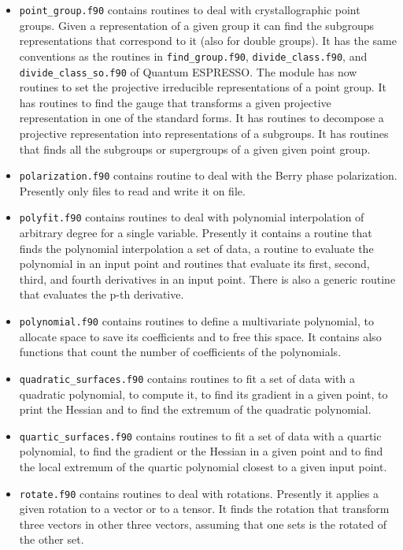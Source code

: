 \documentclass[12pt,a4paper,twoside]{report}
\def\qe{{\sc Quantum ESPRESSO}}
\begin{document}
\begin{itemize}
\item
\texttt{point\_group.f90} contains routines to deal with crystallographic
point groups. Given a representation of a given group it can find 
the subgroups representations that correspond to it (also for
double groups). It has the same conventions as the routines 
in \texttt{find\_group.f90}, \texttt{divide\_class.f90}, and 
\texttt{divide\_class\_so.f90} of \qe. The module has now routines to
set the projective irreducible representations of a point group.
It has routines to find the gauge that transforms a given projective
representation in one of the standard forms. It has routines to decompose
a projective representation into representations of a subgroups.
It has routines that finds all the subgroups or supergroups of a given given
point group.

\item
\texttt{polarization.f90} contains routine to deal with the Berry phase
polarization. Presently only files to read and write it on file.

\item
\texttt{polyfit.f90} contains routines to deal with polynomial
interpolation of arbitrary degree for a single variable. Presently
it contains a routine that finds the polynomial interpolation a set of data,
a routine to evaluate the polynomial in an input point and routines
that evaluate its first, second, third, and fourth derivatives in an 
input point. There is also a generic routine that evaluates the p-th
derivative.

\item
\texttt{polynomial.f90} contains routines to define a multivariate 
polynomial, to allocate space to save its coefficients and to free this
space. It contains also functions that count the number of coefficients 
of the polynomials.

\item
\texttt{quadratic\_surfaces.f90} contains routines to fit a set of data
with a quadratic polynomial, to compute it, to find its gradient 
in a given point, to print the Hessian and to find the extremum of the 
quadratic polynomial. 

\item
\texttt{quartic\_surfaces.f90} contains routines to fit a set of data
with a quartic polynomial, to find the gradient or the Hessian in 
a given point and to find the local extremum of the quartic polynomial
closest to a given input point. 

\item
\texttt{rotate.f90} contains routines to deal with rotations. Presently it
applies a given rotation to a vector or to a tensor.
It finds the rotation that transform three vectors in other three vectors,
assuming that one sets is the rotated of the other set.


\end{itemize}
\end{document}
